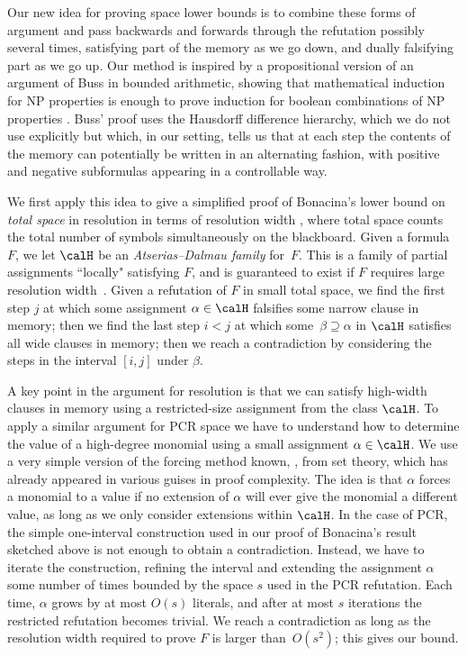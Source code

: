 \documentclass{toc}
\begin{document}
Our new idea for proving space lower bounds is to combine 
these forms of argument and
pass backwards and forwards through the refutation possibly several 
times, 
satisfying part of the memory as we go down, and dually falsifying part as we go up.  
Our method is inspired by a propositional version of  an argument of Buss in bounded arithmetic,
showing that mathematical induction for NP properties is enough  to prove induction for boolean combinations of 
NP properties \cite[Corollary~4]{Buss90}. Buss' proof uses the Hausdorff difference hierarchy, 
which we do not use explicitly but which, in our setting, tells us that at each step the contents
of the memory can potentially be written in an alternating fashion, with positive and negative
subformulas appearing in a controllable way.

We first apply this idea to give a simplified proof of Bonacina's lower bound on \emph{total space} 
in resolution in terms of resolution width
\cite{DBLP:conf/icalp/Bonacina16,DBLP:journals/siamcomp/BonacinaGT16},
where total space counts the total number of symbols simultaneously on the blackboard.
Given a formula $F$, we let $\calH$ be
an \emph{Atserias--Dalmau family} for~$F$. 
This is a family of partial assignments ``locally" satisfying $F$, 
and is guaranteed to exist if $F$ requires large resolution width~\cite{DBLP:journals/jcss/AtseriasD08}.
Given a refutation of $F$ in small total space, we find the first step $j$ at which some assignment $\alpha \in \calH$ falsifies some narrow
clause in memory; then we find the last step $i<j$ at which some~$\beta \supseteq \alpha$ in $\calH$
satisfies all wide clauses in memory; then we reach a contradiction by considering the steps in
the interval $[i,j]$ under $\beta$.

A key point in the argument for resolution is that we can satisfy high-width clauses in memory using a restricted-size assignment from the class $\calH$.  
To apply a similar argument for PCR space we  have to understand how to determine
the value of a high-degree monomial using a small assignment $\alpha \in \calH$.
We use a very simple version of the forcing method known, \eg, from set theory, 
which has already appeared in various guises in proof complexity.
The idea is that $\alpha$ forces a monomial to a value if
no extension of $\alpha$ will ever give the monomial 
a different value, as long as we only consider extensions within $\calH$. 
In the case of PCR, the simple one-interval construction used in our proof of Bonacina's result sketched above
is not enough to obtain a contradiction.
Instead, we have to iterate the construction, refining the interval and extending the assignment $\alpha$
some number of times bounded by the space $s$ used in the PCR refutation. 
Each time, $\alpha$ grows by at most $O(s)$ literals, and after at most $s$ iterations the restricted refutation becomes trivial.
We reach a contradiction as long as the resolution width required to prove $F$ is larger than~$O(s^2)$; this gives our bound.
\end{document}
